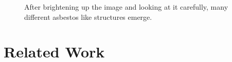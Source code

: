 \begin{figure}[h]
\centering
{}
\caption{After brightening up the image and looking at it carefully, many different asbestos like structures emerge.}
\label{fig:wrong_asbestos_labeling}
\end{figure}

\section{Related Work}


